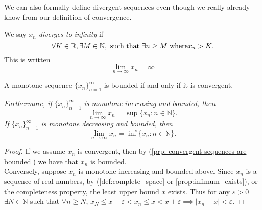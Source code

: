 \documentclass[../main.tex]{subfiles}
\begin{document}
    
    
    
    
    
    
    
    
    
    
    
    
    
    
    
    
    
    
    We can also formally define divergent sequences even though we really already know from our definition of convergence.
    
    
    
    
    
    
    
    
    
    
    
    
    
    
    
    
    \begin{definition}\label{def:divergent sequence}
    We say \(x_n\) \textit{diverges to infinity} if
    \[
    \forall K \in \mathbb{R}, \exists M \in \mathbb{N}, \textnormal{ such that } \exists n \geq  M \textnormal{ where} x_n > K.
    \]
    This is written
    \[
    \lim_{n \to \infty}{x_n} = \infty
    \]
    \end{definition}
    
    
    
    
    
    
    
    
    
    
    
    
    
    
    
    
    \begin{theorem} \label{thm: monotone convergence theorem}
    A monotone sequence \(\{x_n\}_{n=1}^{\infty}\) is bounded if and only if it is convergent.
    
    \textit{Furthermore, if} \(\{x_n\}_{n=1}^{\infty}\) \textit{is monotone increasing and bounded, then}
    \[
    \lim_{n \to \infty} x_n = \sup \{x_n : n \in \mathbb{N} \}.
    \]
    \textit{If} \(\{x_n\}_{n=1}^{\infty}\) \textit{is monotone decreasing and bounded, then}
    \[
    \lim_{n \to \infty} x_n = \inf \{x_n : n \in \mathbb{N} \}.
    \]
    \end{theorem}
    
    
\begin{proof}
If we assume $x_n$ is convergent, then by (\ref{prp: convergent sequences are bounded}) we have that $x_n$ is bounded.
\\ \indent Conversely, suppose $x_n$ is monotone increasing and bounded above.
Since $x_n$ is a sequence of real numbers, by (\ref{def:complete_space} or \ref{prop:infimum_exists}), or the completeness property, the least upper bound $x$ exists.
Thus for any $\varepsilon > 0$ $ \exists N \in \mathbb{N}$ such that  $\forall n \geq N$,  $x_N \leq x - \varepsilon < x_n \leq x < x + \varepsilon \implies |x_n - x| < \varepsilon $.
\end{proof}
    
\end{document}
